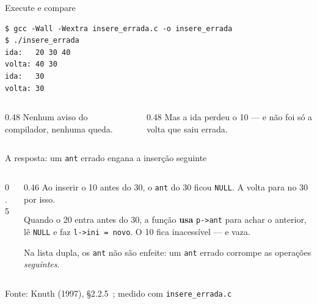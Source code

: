 \documentclass[aspectratio=169]{beamer}
\newcommand{\dno}[4][UFSBlue]{%
  \node[cel, draw=#1, anchor=west] (#2a) at #3 {};
  \node[celv, draw=#1, fill=#1!8, right=0pt of #2a] (#2v) {#4};
  \node[cel, draw=#1, right=0pt of #2v] (#2p) {};
}
\newcommand{\vai}[3][seta]{\draw[#1] ($(#2p.center)+(0,0.1)$) -- ($(#3a.west)+(0,0.1)$);}
\newcommand{\cnull}[1]{\draw[UFSGray] (#1.south west) -- (#1.north east);}
\newcommand{\fonte}[1]{\vfill\hfill{\scriptsize\textcolor{UFSGray}{Fonte: #1}}}
\begin{document}
\begin{frame}[fragile]{Execute e compare}
\begin{lstlisting}[style=shellStyle]
$ gcc -Wall -Wextra insere_errada.c -o insere_errada
$ ./insere_errada
ida:   20 30 40
volta: 40 30
ida:   30
volta: 30
\end{lstlisting}
  \begin{columns}[T]
    \begin{column}{0.48\textwidth}
      \small Nenhum aviso do compilador, nenhuma queda.
    \end{column}
    \begin{column}{0.48\textwidth}
      \small Mas a ida perdeu o 10 --- e não foi só a volta que saiu errada.
    \end{column}
  \end{columns}
\end{frame}

\begin{frame}{A resposta: um \texttt{ant} errado engana a inserção seguinte}
  \begin{columns}[c]
    \begin{column}{0.5\textwidth}
      \begin{center}
      \end{center}
    \end{column}
    \begin{column}{0.46\textwidth}
      \small
      Ao inserir o 10 antes do 30, o \texttt{ant} do 30 ficou
      \texttt{NULL}. A volta para no 30 por isso.

      \medskip
      Quando o 20 entra antes do 30, a função \textbf{usa}
      \texttt{p->ant} para achar o anterior, lê \texttt{NULL} e faz
      \texttt{l->ini = novo}. O 10 fica inacessível --- e vaza.

      \medskip
      Na lista dupla, os \texttt{ant} não são enfeite: um \texttt{ant}
      errado corrompe as operações \emph{seguintes}.
    \end{column}
  \end{columns}
  \fonte{Knuth (1997), §2.2.5~\cite{knuth1997art}; medido com
    \texttt{insere\_errada.c}}
\end{frame}
\end{document}
